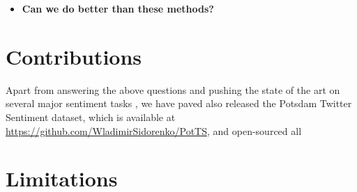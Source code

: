 \begin{itemize}

  \item\textbf{Can we do better than these methods?}
\end{itemize}

\section*{Contributions}

Apart from answering the above questions and pushing the state of the
art on several major sentiment tasks , we have paved also released the
Potsdam Twitter Sentiment dataset, which is available at
\url{https://github.com/WladimirSidorenko/PotTS}, and open-sourced all

\section*{Limitations}

